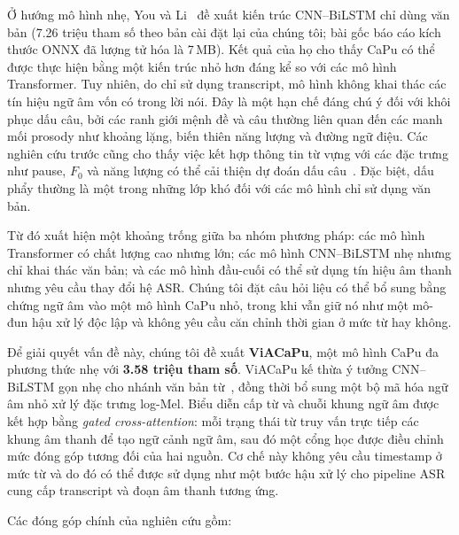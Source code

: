\documentclass[conference,onecolumn]{IEEEtran}
\begin{document}
Ở hướng mô hình nhẹ, You và Li~\cite{you2024lightweight} đề xuất kiến trúc
CNN--BiLSTM chỉ dùng văn bản (7.26 triệu tham số theo bản cài đặt lại của chúng
tôi; bài gốc báo cáo kích thước ONNX đã lượng tử hóa là 7\,MB). Kết quả của họ cho
thấy CaPu có thể được thực hiện bằng một kiến trúc nhỏ hơn đáng kể so với các
mô hình Transformer. Tuy nhiên, do chỉ sử dụng transcript, mô hình không khai
thác các tín hiệu ngữ âm vốn có trong lời nói. Đây là một hạn chế đáng chú ý
đối với khôi phục dấu câu, bởi các ranh giới mệnh đề và câu thường liên quan
đến các manh mối prosody như khoảng lặng, biến thiên năng lượng và đường ngữ
điệu. Các nghiên cứu trước cũng cho thấy việc kết hợp thông tin từ vựng với
các đặc trưng như pause, $F_0$ và năng lượng có thể cải thiện dự đoán dấu
câu~\cite{cho2022,che2020}. Đặc biệt, dấu phẩy thường là một trong những lớp
khó đối với các mô hình chỉ sử dụng văn bản.

Từ đó xuất hiện một khoảng trống giữa ba nhóm phương pháp: các mô hình
Transformer có chất lượng cao nhưng lớn; các mô hình CNN--BiLSTM nhẹ nhưng chỉ
khai thác văn bản; và các mô hình đầu-cuối có thể sử dụng tín hiệu âm thanh
nhưng yêu cầu thay đổi hệ ASR. Chúng tôi đặt câu hỏi liệu có thể bổ sung bằng
chứng ngữ âm vào một mô hình CaPu nhỏ, trong khi vẫn giữ nó như một mô-đun hậu
xử lý độc lập và không yêu cầu căn chỉnh thời gian ở mức từ hay không.


Để giải quyết vấn đề này, chúng tôi đề xuất \textbf{ViACaPu}, một mô hình CaPu
đa phương thức nhẹ với \textbf{3.58 triệu tham số}. ViACaPu kế thừa ý tưởng
CNN--BiLSTM gọn nhẹ cho nhánh văn bản từ~\cite{you2024lightweight}, đồng thời
bổ sung một bộ mã hóa ngữ âm nhỏ xử lý đặc trưng log-Mel. Biểu diễn cấp từ và
chuỗi khung ngữ âm được kết hợp bằng \emph{gated cross-attention}: mỗi trạng
thái từ truy vấn trực tiếp các khung âm thanh để tạo ngữ cảnh ngữ âm, sau đó
một cổng học được điều chỉnh mức đóng góp tương đối của hai nguồn. Cơ chế này
không yêu cầu timestamp ở mức từ và do đó có thể được sử dụng như một bước
hậu xử lý cho pipeline ASR cung cấp transcript và đoạn âm thanh tương ứng.

Các đóng góp chính của nghiên cứu gồm:
\end{document}

